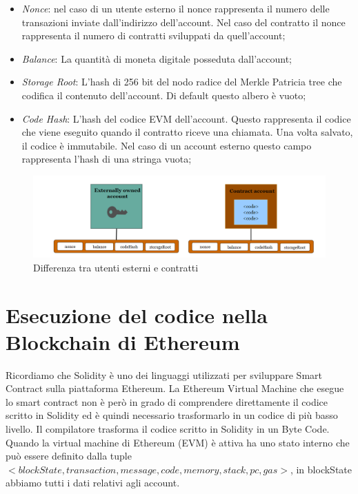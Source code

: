 \documentclass[12pt]{report}
\begin{document}
\begin{itemize}
\item \textit{Nonce}: nel caso di un utente esterno il nonce rappresenta il numero delle transazioni inviate dall'indirizzo dell'account. Nel caso del contratto il nonce rappresenta il numero di contratti sviluppati da quell'account;
\item \textit{Balance}: La quantità di moneta digitale posseduta dall'account;
\item \textit{Storage Root}: L'hash di 256 bit del nodo radice del Merkle Patricia tree \cite{MerklePatriciaTree} che codifica il contenuto dell'account. Di default questo albero è vuoto;
\item \textit{Code Hash}: L'hash del codice EVM \cite{EthereumHomestead} dell'account. Questo rappresenta il codice che viene eseguito quando il contratto riceve una chiamata. Una volta salvato, il codice è immutabile. Nel caso di un account esterno questo campo rappresenta l'hash di una stringa vuota;
\end{itemize}

\begin{figure}[H]
    \includegraphics[width=\textwidth]{utentiContratti}
    \caption{Differenza tra utenti esterni e contratti}
\end{figure}
\newpage
\section{Esecuzione del codice nella Blockchain di Ethereum}

Ricordiamo che Solidity è uno dei linguaggi utilizzati per sviluppare Smart Contract sulla piattaforma Ethereum. 
La Ethereum Virtual Machine che esegue lo smart contract non è però in grado di comprendere direttamente il codice scritto in Solidity ed è quindi necessario trasformarlo in un codice di più basso livello.
Il compilatore trasforma il codice scritto in Solidity in un Byte Code.
Quando la virtual machine di Ethereum (EVM) è attiva ha uno stato interno che può essere definito dalla tuple $<blockState, transaction, message, code, memory, stack, pc, gas>$, in blockState abbiamo tutti i dati relativi agli account.
\end{document}
